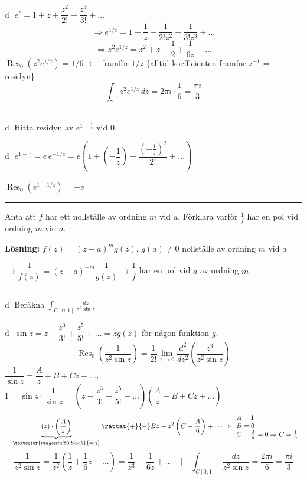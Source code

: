\textcircled{d} \quad $e^z = 1 + z + \dfrac{z^2}{2!} + \dfrac{z^3}{3!} + \dots$
\[ \Rightarrow e^{1/z} = 1 + \frac{1}{z} + \frac{1}{2!z^2} + \frac{1}{3!z^3} + \dots \]
\[ \Rightarrow z^2 e^{1/z} = z^2 + z + \frac{1}{2} + \frac{1}{6z} + \dots \]
$\operatorname{Res}_0(z^2 e^{1/z}) = 1/6$ \quad \textcolor{magenta!80!black}{$\leftarrow$ framför $1/z$ \{alltid koefficienten framför $z^{-1}$ = residyn\}}
\[ \int_\gamma z^2 e^{1/z}\,dz = 2\pi i \cdot \frac{1}{6} = \frac{\pi i}{3} \]

\noindent\rule{\linewidth}{0.4pt}

 \quad \textcircled{d} Hitta residyn av $e^{1 - \frac{1}{z}}$ vid $0$.

\textcircled{d} \quad $e^{1 - \frac{1}{z}} = e\,e^{-1/z} = e\left( 1 + \left( -\dfrac{1}{z} \right) + \dfrac{\left( -\frac{1}{z} \right)^2}{2!} + \dots \right)$

$\operatorname{Res}_0(e^{1 - 1/z}) = -e$

\noindent\rule{\linewidth}{0.4pt}

 \quad Anta att $f$ har ett nollställe av ordning $m$ vid $a$. Förklara varför $\frac{1}{f}$ har en pol vid ordning $m$ vid $a$.

\textbf{Lösning:} $f(z) = (z - a)^m g(z)$, $g(a) \neq 0$ nollställe av ordning $m$ vid $a$

$\to \dfrac{1}{f(z)} = (z - a)^{-m} \dfrac{1}{g(z)} \to \dfrac{1}{f}$ har en pol vid $a$ av ordning $m$.

\noindent\rule{\linewidth}{0.4pt}

 \quad \textcircled{d} Beräkna $\displaystyle\int_{C[0, 1]} \frac{dz}{z^2 \sin z}$

\textcircled{d} \quad $\sin z = z - \dfrac{z^3}{3!} + \dfrac{z^5}{5!} + \dots = zg(z)$ för någon funktion $g$.
\[ \operatorname{Res}_0\left( \frac{1}{z^2 \sin z} \right) = \frac{1}{2!} \lim_{z \to 0} \frac{d^2}{dz^2}\left( \frac{z^3}{z^2 \sin z} \right) \]
$\dfrac{1}{\sin z} = \dfrac{A}{z} + B + Cz + \dots$, \quad $1 = \sin z \cdot \dfrac{1}{\sin z} = \left( z - \dfrac{z^3}{3!} + \dfrac{z^5}{5!} - \dots \right)\left( \dfrac{A}{z} + B + Cz + \dots \right)$
\[ = \underbrace{(z) \cdot \left( \frac{A}{z} \right)}_{\textcolor{magenta!80!black}{= A}} \rattat{+}{-} Bz + z^2\left( C - \frac{A}{6} \right) + \dots \Rightarrow \begin{array}{l} A = 1 \\ B = 0 \\ C - \frac{A}{6} = 0 \Rightarrow C = \frac{1}{6} \end{array} \]
\[ \frac{1}{z^2 \sin z} = \frac{1}{z^2}\left( \frac{1}{z} + \frac{1}{6}z + \dots \right) = \frac{1}{z^3} + \frac{1}{6z} + \dots \quad \Big| \quad \int_{C[0, 1]} \frac{dz}{z^2 \sin z} = \frac{2\pi i}{6} = \underline{\frac{\pi i}{3}} \]
